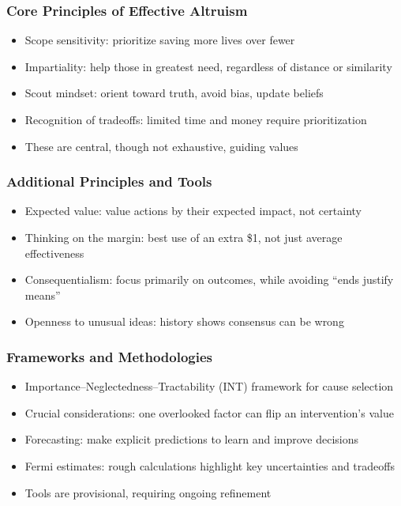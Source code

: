 \begin{frame}[fragile]\frametitle{Core Principles of Effective Altruism}
      \begin{itemize}
        \item Scope sensitivity: prioritize saving more lives over fewer
        \item Impartiality: help those in greatest need, regardless of distance or similarity
        \item Scout mindset: orient toward truth, avoid bias, update beliefs
        \item Recognition of tradeoffs: limited time and money require prioritization
        \item These are central, though not exhaustive, guiding values
      \end{itemize}
\end{frame}
\begin{frame}[fragile]\frametitle{Additional Principles and Tools}
      \begin{itemize}
        \item Expected value: value actions by their expected impact, not certainty
        \item Thinking on the margin: best use of an extra \$1, not just average effectiveness
        \item Consequentialism: focus primarily on outcomes, while avoiding “ends justify means”
        \item Openness to unusual ideas: history shows consensus can be wrong
      \end{itemize}
\end{frame}
\begin{frame}[fragile]\frametitle{Frameworks and Methodologies}
      \begin{itemize}
        \item Importance–Neglectedness–Tractability (INT) framework for cause selection
        \item Crucial considerations: one overlooked factor can flip an intervention’s value
        \item Forecasting: make explicit predictions to learn and improve decisions
        \item Fermi estimates: rough calculations highlight key uncertainties and tradeoffs
        \item Tools are provisional, requiring ongoing refinement
      \end{itemize}
\end{frame}

